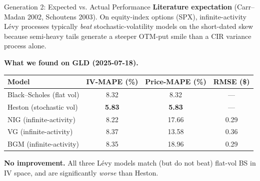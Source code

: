 \documentclass[aspectratio=169]{beamer}
\begin{document}
\begin{frame}{Generation 2: Expected vs. Actual Performance}
  \textbf{Literature expectation} (Carr--Madan 2002, Schoutens 2003).
  On equity-index options (SPX), infinite-activity Lévy processes typically
  \emph{beat} stochastic-volatility models on the short-dated skew because
  semi-heavy tails generate a steeper OTM-put smile than a CIR variance
  process alone.

  \vspace{0.2cm}
  \textbf{What we found on GLD (2025-07-18).}

  \begin{center}
  \begin{tabular}{lccc}
    \toprule
    \textbf{Model} & \textbf{IV-MAPE (\%)} & \textbf{Price-MAPE (\%)} & \textbf{RMSE (\$)} \\
    \midrule
    Black--Scholes (flat vol)    & 8.32  & 8.32  & —     \\
    Heston (stochastic vol)      & \textbf{5.83}  & \textbf{5.83}  & —     \\
    NIG  (infinite-activity)     & 8.22  & 17.66 & 0.29  \\
    VG   (infinite-activity)     & 8.37  & 13.58 & 0.36  \\
    BGM  (infinite-activity)     & 8.35  & 18.96 & 0.29  \\
    \bottomrule
  \end{tabular}
  \end{center}

  \vspace{0.1cm}
  \textbf{No improvement.}  All three Lévy models match (but do not beat)
  flat-vol BS in IV space, and are significantly \emph{worse} than Heston.
\end{frame}
\end{document}
